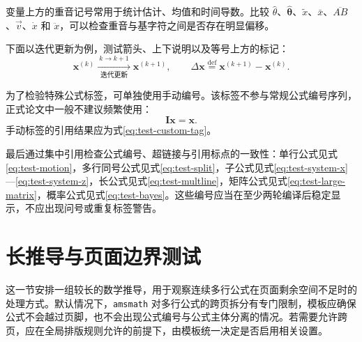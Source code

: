 变量上方的重音记号常用于统计估计、均值和时间导数。比较 $\hat\theta$、$\widehat{\boldsymbol{\theta}}$、$\tilde x$、$\bar x$、$\overline{AB}$、$\vec v$、$\dot x$ 和 $\ddot x$，可以检查重音与基字符之间是否存在明显偏移。

下面以迭代更新为例，测试箭头、上下说明以及等号上方的标记：
\begin{equation}
  \label{eq:test-arrows}
  \boldsymbol{x}^{(k)}
  \xrightarrow[\text{迭代更新}]{\ k\to k+1\ }
  \boldsymbol{x}^{(k+1)},\qquad
  \Delta\boldsymbol{x}\overset{\mathrm{def}}{=}
  \boldsymbol{x}^{(k+1)}-\boldsymbol{x}^{(k)}.
\end{equation}

为了检验特殊公式标签，可单独使用手动编号。该标签不参与常规公式编号序列，正式论文中一般不建议频繁使用：
\begin{equation*}
  \tag{T}\label{eq:test-custom-tag}
  \boldsymbol{I}\boldsymbol{x}=\boldsymbol{x}.
\end{equation*}
手动标签的引用结果应为式\eqref{eq:test-custom-tag}。

最后通过集中引用检查公式编号、超链接与引用标点的一致性：单行公式见式\eqref{eq:test-motion}，多行同号公式见式\eqref{eq:test-split}，子公式见式\eqref{eq:test-system-x}—\eqref{eq:test-system-z}，长公式见式\eqref{eq:test-multline}，矩阵公式见式\eqref{eq:test-large-matrix}，概率公式见式\eqref{eq:test-bayes}。这些编号应当在至少两轮编译后稳定显示，不应出现问号或重复标签警告。

\section{长推导与页面边界测试}
\label{sec:formula-pagebreak}

这一节安排一组较长的数学推导，用于观察连续多行公式在页面剩余空间不足时的处理方式。默认情况下，\texttt{amsmath} 对多行公式的跨页拆分有专门限制，模板应确保公式不会越过页脚，也不会出现公式编号与公式主体分离的情况。若需要允许跨页，应在全局排版规则允许的前提下，由模板统一决定是否启用相关设置。

